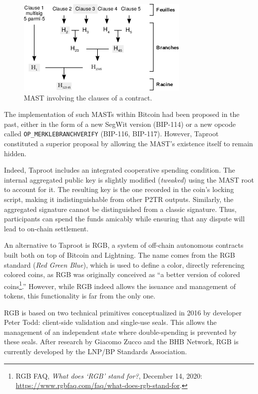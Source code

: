 \documentclass[
  a5paper,
  smalldemyvopaper,10pt,twoside,onecolumn,openright,extrafontsizes,hidelinks]{memoir}
\begin{document}
\begin{figure}

{\centering \includegraphics{chapters/img/taproot-mast.png}

}

\caption{MAST involving the clauses of a contract.}

\end{figure}%

The implementation of such MASTs within Bitcoin had been proposed in the
past, either in the form of a new SegWit version (BIP-114) or a new
opcode called \texttt{OP\_MERKLEBRANCHVERIFY} (BIP-116, BIP-117).
However, Taproot constituted a superior proposal by allowing the MAST's
existence itself to remain hidden.

Indeed, Taproot includes an integrated cooperative spending condition.
The internal aggregated public key is slightly modified (\emph{tweaked})
using the MAST root to account for it. The resulting key is the one
recorded in the coin's locking script, making it indistinguishable from
other P2TR outputs. Similarly, the aggregated signature cannot be
distinguished from a classic signature. Thus, participants can spend the
funds amicably while ensuring that any dispute will lead to on-chain
settlement.

An alternative to Taproot is RGB, a system of off-chain autonomous
contracts built both on top of Bitcoin and Lightning. The name comes
from the RGB standard (\emph{Red Green Blue}), which is used to define a
color, directly referencing colored coins, as RGB was originally
conceived as ``a better version of colored coins\footnote{RGB FAQ,
  \emph{What does `RGB' stand for?}, December 14, 2020:
  \url{https://www.rgbfaq.com/faq/what-does-rgb-stand-for}.}.'' However,
while RGB indeed allows the issuance and management of tokens, this
functionality is far from the only one.

RGB is based on two technical primitives conceptualized in 2016 by
developer Peter Todd: client-side validation and single-use seals. This
allows the management of an independent state where double-spending is
prevented by these seals. After research by Giacomo Zucco and the BHB
Network, RGB is currently developed by the LNP/BP Standards Association.
\end{document}
